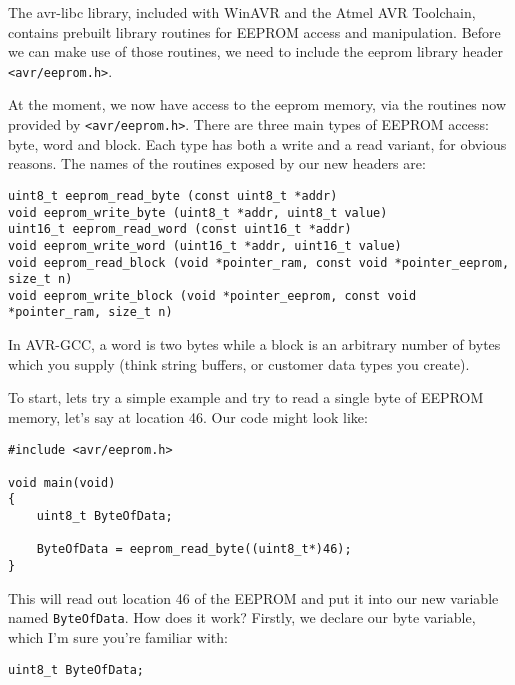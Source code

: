 \documentclass[a4paper,oneside,notitlepage]{book}
\begin{document}
The avr-libc library, included with WinAVR and the Atmel AVR Toolchain, contains prebuilt library routines for EEPROM access and manipulation. Before we can make use of those routines, we need to include the eeprom library header \lstinline{<avr/eeprom.h>}.

At the moment, we now have access to the eeprom memory, via the routines now provided by \lstinline{<avr/eeprom.h>}. There are three main types of EEPROM access: byte, word and block. Each type has both a write and a read variant, for obvious reasons. The names of the routines exposed by our new headers are:

\begin{center}
\begin{lstlisting}
uint8_t eeprom_read_byte (const uint8_t *addr)
void eeprom_write_byte (uint8_t *addr, uint8_t value)
uint16_t eeprom_read_word (const uint16_t *addr)
void eeprom_write_word (uint16_t *addr, uint16_t value)
void eeprom_read_block (void *pointer_ram, const void *pointer_eeprom, size_t n)
void eeprom_write_block (void *pointer_eeprom, const void *pointer_ram, size_t n)
\end{lstlisting}
\end{center}

In AVR-GCC, a word is two bytes while a block is an arbitrary number of bytes which you supply (think string buffers, or customer data types you create).

To start, lets try a simple example and try to read a single byte of EEPROM memory, let's say at location 46. Our code might look like:

\begin{center}
\begin{lstlisting}
#include <avr/eeprom.h>

void main(void)
{
    uint8_t ByteOfData;

    ByteOfData = eeprom_read_byte((uint8_t*)46);
}
\end{lstlisting}
\end{center}

This will read out location 46 of the EEPROM and put it into our new variable named \lstinline{ByteOfData}. How does it work? Firstly, we declare our byte variable, which I'm sure you're familiar with:

\begin{center}
\begin{lstlisting}
uint8_t ByteOfData;
\end{lstlisting}
\end{center}
\end{document}
